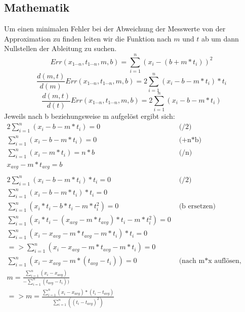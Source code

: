 \documentclass[a4paper]{article}
\begin{document}
\subsection{Mathematik}
Um einen minimalen Fehler bei der Abweichung der Messwerte von der Approximation zu finden leiten wir die Funktion nach $m$ und $t$ ab um dann Nullstellen der Ableitung zu suchen.\\
\[ Err(x_{1\cdots n}, t_{1\cdots n},m,b)= \sum_{i=1}^n (x_i-(b+m*t_i))^2 \]
\[\frac{d(m,t)}{d(m)}Err(x_{1\cdots n}, t_{1\cdots n},m,b)= 2\sum_{i=1}^n(x_i-b-m*t_i)*t_i \]
\[\frac{d(m,t)}{d(t)}Err(x_{1\cdots n}, t_{1\cdots n},m,b)= 2\sum_{i=1}^n(x_i-b-m*t_i) \]
Jeweils nach b beziehungsweise m aufgelöst ergibt sich:
\begin{align*}
2\sum_{i=1}^n(x_i-b-m*t_i) = 0 & \text{   (/2)}\\
	\sum_{i=1}^n(x_i-b-m*t_i) = 0 & \text{   (+n*b)}\\
  \sum_{i=1}^n(x_i-m*t_i) = n*b & \text{   (/n)} \\ 
  x_{avg}-m*t_{avg} = b \\
  \\
 2\sum_{i=1}^n(x_i-b-m*t_i)*t_i  = 0 & \text{   (/2)}\\
 \sum_{i=1}^n(x_i-b-m*t_i)*t_i  = 0& \text{   }\\
 \sum_{i=1}^n(x_i*t_i -b*t_i -m*t_i^2) = 0& \text{   (b ersetzen)}\\
 \sum_{i=1}^n(x_i*t_i -(x_{avg}-m*t_{avg})*t_i -m*t_i^2) = 0\\
 \sum_{i=1}^n(x_i -x_{avg}-m*t_{avg} -m*t_i)*t_i = 0\\
=>\sum_{i=1}^n(x_i -x_{avg}-m*t_{avg} -m*t_i)=0 \\
\sum_{i=1}^n(x_i -x_{avg}-m*(t_{avg} -t_i))=0 & \text{   (nach m*x auflösen, durch x teilen)}\\
m=\frac{\sum_{i=1}^n(x_i -x_{avg})}
{-\sum_{i=1}^n(t_{avg} -t_i))} \\
=>m=\frac{\sum_{i=1}^n(x_i -x_{avg})*( t_i-t_{avg})}
{\sum_{i=1}^n(( t_i-t_{avg})^2)} \\
\end{align*}
\end{document}
